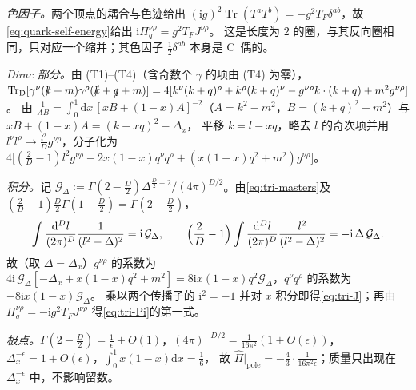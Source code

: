 \documentclass[UTF8,a4paper,11pt,fontset=fandol]{ctexart}
\makeatletter
\theoremstyle{cplain}
\theoremstyle{cdefinition}
\theoremstyle{cremark}
\renewcommand{\proofname}{证明}
\renewenvironment{proof}[1][\proofname]{\par\pushQED{\qed}\normalfont\topsep6\p@\@plus6\p@\relax
  \trivlist\item[\hskip\labelsep\itshape #1\hspace{0.5em}]\ignorespaces}{\popQED\endtrivlist\@endpefalse}
\numberwithin{equation}{section}
\DeclareMathOperator{\Tr}{Tr}
\newcommand{\TrD}{\operatorname{Tr}_{\mathrm{D}}}   %
\newcommand{\sla}[1]{\slashed{#1}}                  %
\newcommand{\dd}{\mathrm{d}}                         %
\newcommand{\ii}{\mathrm{i}}                        %
\makeatother
\begin{document}
\begin{proof}
\emph{色因子。}两个顶点的耦合与色迹给出 $(\ii g)^2\Tr(T^aT^b)=-g^2T_F\delta^{ab}$，故\cref{eq:quark-self-energy}给出 $\ii\Pi_q^{\nu\rho}=g^2T_FJ^{\nu\rho}$。
这是长度为 $2$ 的圈，与其反向圈相同，只对应一个缩并；其色因子 $\frac12\delta^{ab}$ 本身是 C~偶的。

\emph{Dirac 部分。}由 (T1)--(T4)（含奇数个 $\gamma$ 的项由 (T4) 为零），$\TrD[\gamma^\nu(\sla k+m)\gamma^\rho(\sla k+\sla q+m)]=4[k^\nu(k+q)^\rho+k^\rho(k+q)^\nu-g^{\nu\rho}k\cdot(k+q)+m^2g^{\nu\rho}]$。
由 $\frac1{AB}=\int_0^1\dd x\,[xB+(1-x)A]^{-2}$（$A=k^2-m^2$，$B=(k+q)^2-m^2$）与 $xB+(1-x)A=(k+xq)^2-\Delta_x$，
平移 $k=l-xq$，略去 $l$ 的奇次项并用 $l^\nu l^\rho\to\frac{l^2}{D}g^{\nu\rho}$，分子化为
$4\bigl[(\frac2D-1)l^2g^{\nu\rho}-2x(1-x)q^\nu q^\rho+(x(1-x)q^2+m^2)g^{\nu\rho}\bigr]$。

\emph{积分。}记 $\mathcal G_\Delta:=\Gamma(2-\frac D2)\Delta^{\frac D2-2}/(4\pi)^{D/2}$。由\cref{eq:tri-masters}及 $(\frac2D-1)\frac D2\Gamma(1-\frac D2)=\Gamma(2-\frac D2)$，
\begin{equation*}
\int\frac{\dd^Dl}{(2\pi)^D}\frac{1}{(l^2-\Delta)^2}=\ii\,\mathcal G_\Delta,\qquad
\Bigl(\frac2D-1\Bigr)\int\frac{\dd^Dl}{(2\pi)^D}\frac{l^2}{(l^2-\Delta)^2}=-\ii\,\Delta\,\mathcal G_\Delta .
\end{equation*}
故（取 $\Delta=\Delta_x$）$g^{\nu\rho}$ 的系数为 $4\ii\,\mathcal G_\Delta[-\Delta_x+x(1-x)q^2+m^2]=8\ii x(1-x)q^2\mathcal G_\Delta$，$q^\nu q^\rho$ 的系数为 $-8\ii x(1-x)\mathcal G_\Delta$。
乘以两个传播子的 $\ii^2=-1$ 并对 $x$ 积分即得\cref{eq:tri-J}；再由 $\Pi_q^{\nu\rho}=-\ii g^2T_FJ^{\nu\rho}$ 得\cref{eq:tri-Pi}的第一式。

\emph{极点。}$\Gamma(2-\frac D2)=\frac1\epsilon+O(1)$，$(4\pi)^{-D/2}=\frac{1}{16\pi^2}(1+O(\epsilon))$，$\Delta_x^{-\epsilon}=1+O(\epsilon)$，$\int_0^1x(1-x)\dd x=\frac16$，
故 $\hat\Pi|_{\mathrm{pole}}=-\frac43\cdot\frac{1}{16\pi^2\epsilon}$；质量只出现在 $\Delta_x^{-\epsilon}$ 中，不影响留数。
\end{proof}
\end{document}
